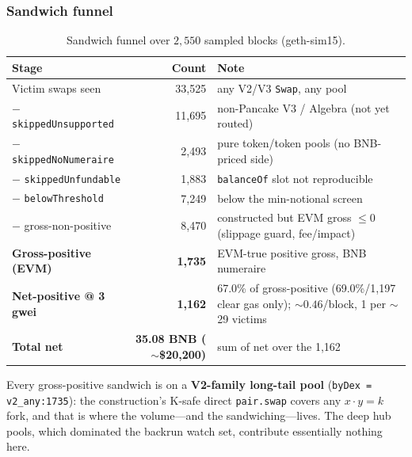 \documentclass[11pt]{article}
\newcommand{\code}[1]{\texttt{#1}}
\begin{document}
\subsubsection{Sandwich funnel}
\begin{table}[h]\centering
\caption{Sandwich funnel over $2{,}550$ sampled blocks (geth-sim15).}\label{tab:swfunnel}
\begin{tabular}{lrl}
\toprule
Stage & Count & Note \\
\midrule
Victim swaps seen & 33{,}525 & any V2/V3 \code{Swap}, any pool \\
$-$ \code{skippedUnsupported} & 11{,}695 & non-Pancake V3 / Algebra (not yet routed) \\
$-$ \code{skippedNoNumeraire} & 2{,}493 & pure token/token pools (no BNB-priced side) \\
$-$ \code{skippedUnfundable} & 1{,}883 & \code{balanceOf} slot not reproducible \\
$-$ \code{belowThreshold} & 7{,}249 & below the min-notional screen \\
$-$ gross-non-positive & 8{,}470 & constructed but EVM gross $\leq 0$ (slippage guard, fee/impact) \\
\textbf{Gross-positive (EVM)} & \textbf{1{,}735} & EVM-true positive gross, BNB numeraire \\
\textbf{Net-positive @ 3 gwei} & \textbf{1{,}162} & 67.0\% of gross-positive (69.0\%/1{,}197 clear gas only); $\sim$$0.46$/block, 1 per $\sim$29 victims \\
\textbf{Total net} & \textbf{35.08 BNB ($\sim$\$20{,}200)} & sum of net over the 1{,}162 \\
\bottomrule
\end{tabular}
\end{table}

\noindent Every gross-positive sandwich is on a \textbf{V2-family long-tail pool}
(\code{byDex = v2\_any:1735}): the construction's K-safe direct \code{pair.swap}
covers any $x\cdot y=k$ fork, and that is where the volume---and the sandwiching---lives.
The deep hub pools, which dominated the backrun watch set, contribute essentially
nothing here.
\end{document}
